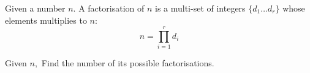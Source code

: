 Given a number $n.$ A factorisation of $n$ is a multi-set of integers $\{ d_1 \dots  d_r \}$ whose elements multiplies to $n:$
$$
n=\prod_{i=1}^r d_i
$$

Given $n,$ Find the number of its possible factorisations.

